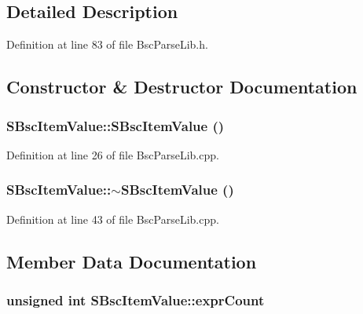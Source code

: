 \subsection{Detailed Description}


Definition at line 83 of file BscParseLib.h.

\subsection{Constructor \& Destructor Documentation}
\hypertarget{struct_s_bsc_item_value_1058915d16fe62a8b464cf3c9dbc3b8b}{
\subsubsection[{SBscItemValue}]{\setlength{\rightskip}{0pt plus 5cm}SBscItemValue::SBscItemValue ()}}
\label{struct_s_bsc_item_value_1058915d16fe62a8b464cf3c9dbc3b8b}




Definition at line 26 of file BscParseLib.cpp.\hypertarget{struct_s_bsc_item_value_9997da334a63ae0a0181b65bee5ec0d9}{
\subsubsection[{$\sim$SBscItemValue}]{\setlength{\rightskip}{0pt plus 5cm}SBscItemValue::$\sim$SBscItemValue ()}}
\label{struct_s_bsc_item_value_9997da334a63ae0a0181b65bee5ec0d9}




Definition at line 43 of file BscParseLib.cpp.

\subsection{Member Data Documentation}
\hypertarget{struct_s_bsc_item_value_ba6f143883b5a9315fe42900e3b20c38}{
\subsubsection[{exprCount}]{\setlength{\rightskip}{0pt plus 5cm}unsigned int {\bf SBscItemValue::exprCount}}}
\label{struct_s_bsc_item_value_ba6f143883b5a9315fe42900e3b20c38}




